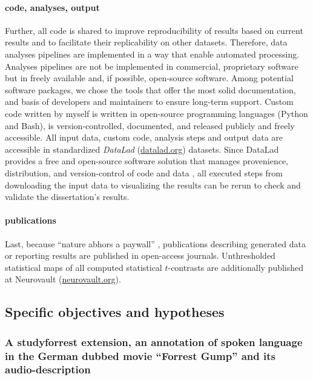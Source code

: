 \paragraph{code, analyses, output}

Further, all code is shared to improve reproducibility of results based on
current results and to facilitate their replicability on other datasets.
Therefore, data analyses pipelines are implemented in a way that enable
automated processing.
%
Analyses pipelines are not be implemented in commercial, proprietary software
but in freely available and, if possible, open-source software.
Among potential software packages, we chose the tools that offer the most solid
documentation, and basis of developers and maintainers to ensure long-term
support.
Custom code written by myself is written in open-source programming languages
(Python and Bash), is version-controlled, documented, and released publicly and
freely accessible.
%
All input data, custom code, analysis steps and output data are accessible in
standardized \textit{DataLad} (\href{www.datalad.org}{datalad.org}) datasets.
Since DataLad provides a free and open-source software solution that manages
provenience, distribution, and version-control of code and data
\citep{halchenko2021datalad}, all executed steps from downloading the input data
to visualizing the results can be rerun to check and validate the dissertation's
results.


\paragraph{publications}
Last, because ``nature abhors a paywall'' \citep{dupre2020nature}, publications
describing generated data or reporting results are published in open-access
journals.
Unthresholded statistical maps of all computed statistical $t$-contrasts are
additionally published at Neurovault
(\href{https://neurovault.org/}{neurovault.org}).


\subsection{Specific objectives and hypotheses}


\subsubsection{A studyforrest extension, an annotation of spoken language in the
German dubbed movie ``Forrest Gump'' and its audio-description}


